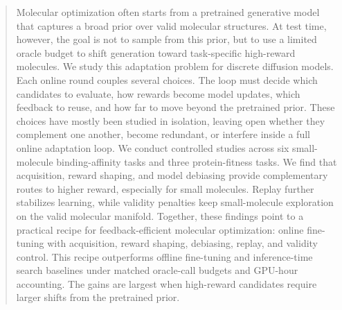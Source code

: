 \documentclass{article}
\begin{document}
\begin{abstract}
Molecular optimization often starts from a pretrained generative model that captures a broad prior over valid molecular structures. At test time, however, the goal is not to sample from this prior, but to use a limited oracle budget to shift generation toward task-specific high-reward molecules. We study this adaptation problem for discrete diffusion models. Each online round couples several choices. The loop must decide which candidates to evaluate, how rewards become model updates, which feedback to reuse, and how far to move beyond the pretrained prior. These choices have mostly been studied in isolation, leaving open whether they complement one another, become redundant, or interfere inside a full online adaptation loop. We conduct controlled studies across six small-molecule binding-affinity tasks and three protein-fitness tasks. We find that acquisition, reward shaping, and model debiasing provide complementary routes to higher reward, especially for small molecules. Replay further stabilizes learning, while validity penalties keep small-molecule exploration on the valid molecular manifold. Together, these findings point to a practical recipe for feedback-efficient molecular optimization: online fine-tuning with acquisition, reward shaping, debiasing, replay, and validity control. This recipe outperforms offline fine-tuning and inference-time search baselines under matched oracle-call budgets and GPU-hour accounting. The gains are largest when high-reward candidates require larger shifts from the pretrained prior.

\end{abstract}
\end{document}
